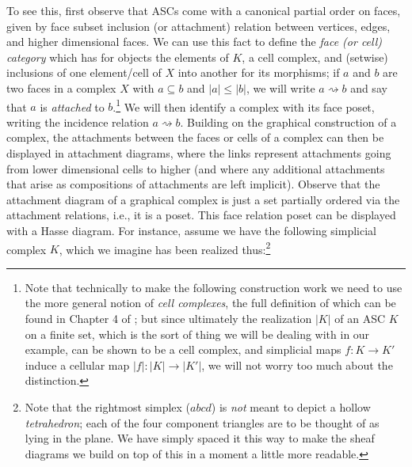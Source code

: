 \documentclass[a4paper]{book}
\theoremstyle{definition}
\theoremstyle{definition}
\theoremstyle{definition}
\theoremstyle{theorem}
\theoremstyle{definition}
\begin{document}
To see this, first observe that ASCs come with a canonical partial order on faces, given by face subset inclusion (or attachment) relation between vertices, edges, and higher dimensional faces. We can use this fact to define the \textit{face (or cell) category} which has for objects the elements of $K$, a cell complex, and (setwise) inclusions of one element/cell of $X$ into another for its morphisms; if $a$ and $b$ are two faces in a complex $X$ with $a \subseteq b$ and $|a| \leq |b|$, we will write $a \rightsquigarrow b$ and say that $a$ is \textit{attached} to $b$.\footnote{Note that technically to make the following construction work we need to use the more general notion of \textit{cell complexes}, the full definition of which can be found in Chapter 4 of \cite{curry_sheaves_2013}; but since ultimately the realization $|K|$ of an ASC $K$ on a finite set, which is the sort of thing we will be dealing with in our example, can be shown to be a cell complex, and simplicial maps $f: K \rightarrow K'$ induce a cellular map $|f|: |K| \rightarrow |K'|$, we will not worry too much about the distinction.} We will then identify a complex with its face poset, writing the incidence relation $a \rightsquigarrow b$. Building on the graphical construction of a complex, the attachments between the faces or cells of a complex can then be displayed in attachment diagrams, where the links represent attachments going from lower dimensional cells to higher (and where any additional attachments that arise as compositions of attachments are left implicit). Observe that the attachment diagram of a graphical complex is just a set partially ordered via the attachment relations, i.e., it is a poset. This face relation poset can be displayed with a Hasse diagram. For instance, assume we have the following simplicial complex $K$, which we imagine has been realized thus:\footnote{Note that the rightmost simplex ($abcd$) is \textit{not} meant to depict a hollow \textit{tetrahedron}; each of the four component triangles are to be thought of as lying in the plane. We have simply spaced it this way to make the sheaf diagrams we build on top of this in a moment a little more readable.} 
\end{document}
